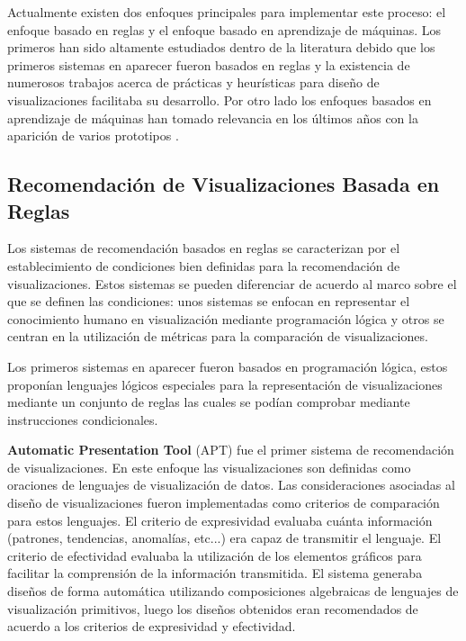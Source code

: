 Actualmente existen dos enfoques principales para implementar este proceso: el enfoque basado en reglas
y el enfoque basado en aprendizaje de m\'aquinas. Los primeros han sido altamente estudiados dentro de la 
literatura debido que los primeros sistemas en aparecer fueron basados en reglas y la existencia
de numerosos trabajos acerca de pr\'acticas y heur\'isticas para dise\~no de visualizaciones facilitaba su desarrollo.
Por otro lado los enfoques basados en aprendizaje de m\'aquinas han tomado relevancia en los \'ultimos a\~nos con la aparici\'on
de varios prototipos \cite{zeng2021we}.

\subsection{Recomendaci\'on de Visualizaciones Basada en Reglas} \label{subsection:rule-viz-rec}

Los sistemas de recomendaci\'on basados en reglas se caracterizan por el establecimiento
de condiciones bien definidas para la recomendaci\'on de visualizaciones. Estos sistemas
se pueden diferenciar de acuerdo al marco sobre el que se definen las condiciones: unos sistemas
se enfocan en representar el conocimiento humano en visualizaci\'on mediante programaci\'on l\'ogica y 
otros se centran en la utilizaci\'on de m\'etricas para la comparaci\'on de visualizaciones.

Los primeros sistemas en aparecer fueron basados en programaci\'on l\'ogica, estos propon\'ian lenguajes
l\'ogicos especiales para la representaci\'on de visualizaciones mediante un conjunto de reglas las cuales
se pod\'ian comprobar mediante instrucciones condicionales.

\textbf{Automatic Presentation Tool} (APT) \cite{mackinlay1986automating} fue el primer sistema de recomendaci\'on de visualizaciones.
En este enfoque las visualizaciones son definidas como oraciones de lenguajes
de visualizaci\'on de datos. Las consideraciones asociadas al dise\~no de visualizaciones
fueron implementadas como criterios de comparaci\'on para estos lenguajes. El criterio de expresividad
evaluaba cu\'anta informaci\'on (patrones, tendencias, anomal\'ias, etc...) era capaz de
transmitir el lenguaje. El criterio de efectividad evaluaba la utilizaci\'on de los
elementos gr\'aficos para facilitar la comprensi\'on de la informaci\'on transmitida.
El sistema generaba dise\~nos de forma autom\'atica utilizando composiciones algebraicas
de lenguajes de visualizaci\'on primitivos, luego los dise\~nos obtenidos eran recomendados de acuerdo
a los criterios de expresividad y efectividad.



